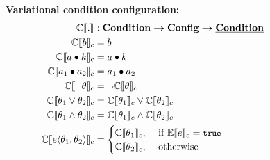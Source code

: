 \begin{figure}
\textbf{Variational condition configuration:}
\begin{alignat*}{1}
\ecSem [] . &: \vCondSet \totype \confSet \totype \pCondSet\\
%
\ecSem \bTag &= \bTag \\
%
\ecSem \vAttOpCte &= 
    \vAttOpCte\\
%
\ecSem \vAttOpAtt &= 
       \vAttOpAtt\\
%
\ecSem {\neg \vCond} &= \neg \ecSem \vCond\\
%
\ecSem {\orr \vCond} &= \ecSem {\vCond_1} \vee \ecSem {\vCond_2}\\
%
\ecSem {\annd \vCond} &= \ecSem {\vCond_1} \wedge \ecSem {\vCond_2}\\
%
\ecSem {\chc {\vCond_1, \vCond_2}} &=
	\begin{cases}
		\ecSem {\vCond_1}, &\text{ if } \fSem \dimMeta  = \t \\
		\ecSem {\vCond_2}, &\text{ otherwise}
	\end{cases}
\end{alignat*}


\end{figure}
